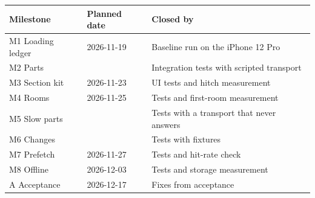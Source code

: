 \begin{center}\small
\begin{tabularx}{\linewidth}{@{}l l X@{}}
\toprule Milestone & Planned date & Closed by \\ \midrule
M1 Loading ledger & 2026-11-19 & Baseline run on the iPhone 12 Pro \\
M2 Parts &  & Integration tests with scripted transport \\
M3 Section kit & 2026-11-23 & UI tests and hitch measurement \\
M4 Rooms & 2026-11-25 & Tests and first-room measurement \\
M5 Slow parts &  & Tests with a transport that never answers \\
M6 Changes &  & Tests with fixtures \\
M7 Prefetch & 2026-11-27 & Tests and hit-rate check \\
M8 Offline & 2026-12-03 & Tests and storage measurement \\
A Acceptance & 2026-12-17 & Fixes from acceptance \\
\bottomrule
\end{tabularx}
\end{center}
